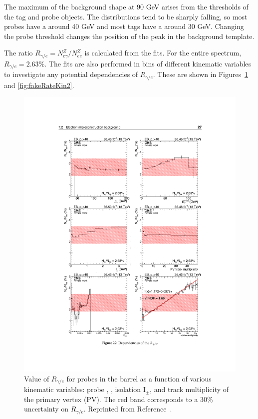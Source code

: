 The maximum of the background shape at 90 GeV arises from the \pT thresholds of the tag and probe objects. The \pT distributions tend to be sharply falling, so most probes have a \pT around 40 GeV and most tags have a \pT around 30 GeV. Changing the probe \pT threshold changes the position of the peak in the background template.

The ratio $R_{\gamma/e} = N_{e\gamma}^Z/N_{ee}^Z$ is calculated from the fits. For the entire spectrum, $R_{\gamma/e} = 2.63\%$. The fits are also performed in bins of different kinematic variables to investigate any potential dependencies of $R_{\gamma/e}$. These are shown in Figures~\ref{fig:fakeRateKin1} and \ref{fig:fakeRateKin2}. 

\begin{figure}[h]
\begin{center}
\includegraphics[width=\textwidth]{Figures/DataAnalysis/fakeKin1.pdf}
\end{center}
\caption{Value of $R_{\gamma/e}$ for probes in the barrel as a function of various kinematic variables: probe \pT, \ETmiss, isolation I$_{\pm}$, 
and track multiplicity of the primary vertex (PV). The red band corresponds to a 30\% uncertainty 
on $R_{\gamma/e}$. Reprinted from Reference~\cite{KnutAN}.
}
\label{fig:fakeRateKin1}
\end{figure}

